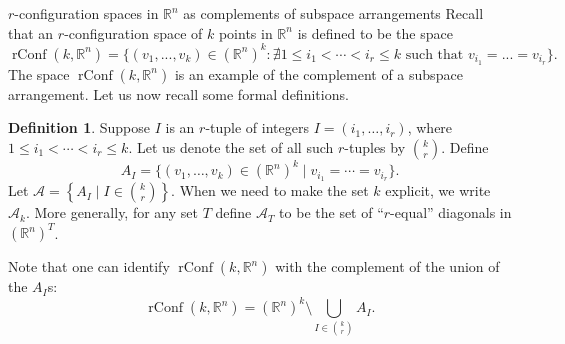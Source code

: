 \documentclass[12pt]{amsart}
\newcommand{\R}{{\mathbb R}}
\newcommand{\rConf}{\operatorname{rConf}}
\newcommand{\calA}{{\mathcal{A}}}
\theoremstyle{plain}
\theoremstyle{definition}
\newtheorem{defin}[thm]{Definition}
\theoremstyle{remark}
\begin{document}
\begin{section}{$r$-configuration spaces in $\mathbb R^n$ as complements of subspace arrangements}
Recall that an $r$-configuration space of $k$ points in $\R^n$ is defined to be the space
$$
\rConf(k, \R^n)=\{(v_1,...,v_k) \in (\R^n)^k : \nexists 1\le i_1<\cdots < i_r \le k \text{ such that } v_{i_1}=...=v_{i_r} \}.
$$
The space $\rConf(k, \R^n)$ is an example of the complement of a subspace arrangement. Let us now recall some formal definitions. %
\begin{defin}
Suppose $I$ is an $r$-tuple of integers $I=(i_1, \ldots, i_r)$, where $1\le i_1<\cdots<i_r\le k$. Let us denote the set of all such $r$-tuples by $k\choose r$. Define
\[
A_I=\{(v_1, \ldots, v_k)\in (\R^n)^k\mid v_{i_1}=\cdots=v_{i_r} \}.
\]
Let $\mathcal{A}=\left\{A_I\mid I\in {k\choose r}\right\}$. When we need to make the set $k$ explicit, we write $\mathcal{A}_k$. More generally, for any set $T$ define $\mathcal{A}_T$ to be the set of ``$r$-equal'' diagonals in $(\R^n)^T$. 
\end{defin}

Note that one can identify $\rConf(k, \R^n)$ with the complement of the union of the $A_I$s:
\[
\rConf(k, \R^n)=(\R^n)^k \setminus \bigcup_{I\in {k\choose r}} A_I.
\]




\end{section}
\end{document}
